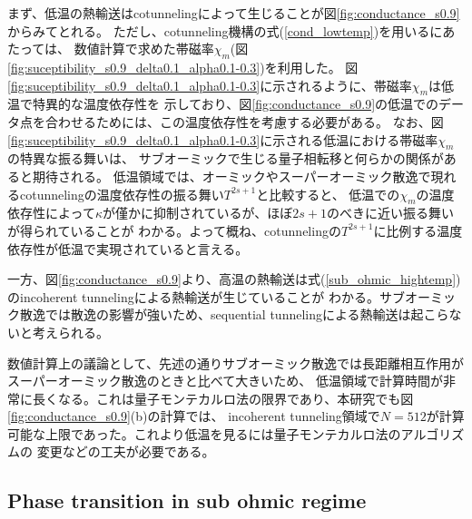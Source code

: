 まず、低温の熱輸送はcotunnelingによって生じることが図\ref{fig:conductance_s0.9}からみてとれる。
ただし、cotunneling機構の式(\ref{cond_lowtemp})を用いるにあたっては、
数値計算で求めた帯磁率$\chi_m$(図\ref{fig:suceptibility_s0.9_delta0.1_alpha0.1-0.3})を利用した。
図\ref{fig:suceptibility_s0.9_delta0.1_alpha0.1-0.3}に示されるように、帯磁率$\chi_m$は低温で特異的な温度依存性を
示しており、図\ref{fig:conductance_s0.9}の低温でのデータ点を合わせるためには、この温度依存性を考慮する必要がある。
なお、図\ref{fig:suceptibility_s0.9_delta0.1_alpha0.1-0.3}に示される低温における帯磁率$\chi_m$の特異な振る舞いは、
サブオーミックで生じる量子相転移と何らかの関係があると期待される。
低温領域では、オーミックやスーパーオーミック散逸で現れるcotunnelingの温度依存性の振る舞い$T^{2s+1}$と比較すると、
低温での$\chi_m$の温度依存性によって$\kappa$が僅かに抑制されているが、ほぼ$2s+1$のべきに近い振る舞いが得られていることが
わかる。よって概ね、cotunnelingの$T^{2s+1}$に比例する温度依存性が低温で実現されていると言える。

一方、図\ref{fig:conductance_s0.9}より、高温の熱輸送は式(\ref{sub_ohmic_hightemp})のincoherent tunnelingによる熱輸送が生じていることが
わかる。サブオーミック散逸では散逸の影響が強いため、sequential tunnelingによる熱輸送は起こらないと考えられる。

数値計算上の議論として、先述の通りサブオーミック散逸では長距離相互作用がスーパーオーミック散逸のときと比べて大きいため、
低温領域で計算時間が非常に長くなる。これは量子モンテカルロ法の限界であり、本研究でも図\ref{fig:conductance_s0.9}(b)の計算では、
incoherent tunneling領域で$N=512$が計算可能な上限であった。これより低温を見るには量子モンテカルロ法のアルゴリズムの
変更などの工夫が必要である。

\subsection{Phase transition in sub ohmic regime}
\label{sec:phasetransition}

